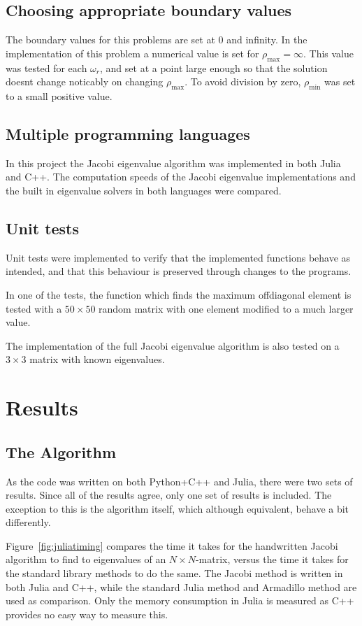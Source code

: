 \documentclass[aps,reprint]{revtex4-1}
\begin{document}
\subsection{Choosing appropriate boundary values}
The boundary values for this problems are set at $0$ and infinity. In the
implementation of this problem a numerical value is set for $\rho_\text{max} = \infty$.
This value was tested for each $\omega_r$, and set at a point large enough
so that the solution doesnt change noticably on changing $\rho_\text{max}$.
To avoid division by zero, $\rho_\text{min}$ was set to a small positive value.
\subsection{Multiple programming languages}
In this project the Jacobi eigenvalue algorithm was implemented in both Julia and
C++. The computation speeds of the Jacobi eigenvalue implementations
and the built in eigenvalue solvers in both languages were compared.
\subsection{Unit tests}
Unit tests were implemented to verify that the implemented functions behave
as intended, and that this behaviour is preserved through changes to the programs.

In one of the tests, the function which finds the maximum offdiagonal element
is tested with a $50 \times 50$ random matrix with one element modified to a
much larger value.

The implementation of the full Jacobi eigenvalue algorithm is also tested on a
$3 \times 3$ matrix with known eigenvalues.
\section{Results}
\label{sec:results}

\subsection{The Algorithm}
\label{sec:algorithm}

As the code was written on both Python+C++ and Julia, there were two sets of
results. Since all of the results agree, only one set of results is included.
The exception to this is the algorithm itself, which although equivalent, behave
a bit differently.

Figure~\ref{fig:juliatiming} compares the time it takes for the handwritten
Jacobi algorithm to find to eigenvalues of an \(N\times N\)-matrix, versus the
time it takes for the standard library methods to do the same. The Jacobi method
is written in both Julia and C++, while the standard Julia method and Armadillo
method are used as comparison. Only the memory consumption in Julia is measured
as C++ provides no easy way to measure this.
\end{document}
